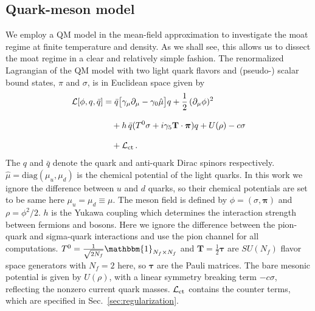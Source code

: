 \documentclass[reprint,english,superscriptaddress,preprintnumbers,amsmath,amssymb,aps,prd]{revtex4-2}
\def\Sec#1{Sec.~\ref{#1}}
\begin{document}
\subsection{Quark-meson model}\label{sec:qm_model}
%
We employ a QM model in the mean-field approximation to investigate the moat regime at finite temperature and density. As we shall see, this allows us to dissect the moat regime in a clear and relatively simple fashion. The renormalized Lagrangian of the QM model with two light quark flavors and (pseudo-) scalar bound states, $\pi$ and $\sigma$, is in Euclidean space given by
%
\begin{align}\label{eq:L}
\begin{split}
\mathcal{L}[\phi,q,\bar{q}]&=\bar{q}\big[\gamma_\mu\partial_\mu-\gamma_0 \hat{\mu}\big]q+\frac{1}{2}\,(\partial_\mu\phi)^2\\[2ex]
&\quad+h\,\bar{q}(T^0\sigma+i\gamma_5\mathbf{T}\cdot\boldsymbol{\pi})q+U(\rho)-c\sigma\\[2ex]
&\quad+ \mathcal{L}_{\rm ct}\,.
\end{split}
\end{align}
%
The $q$ and $\bar{q}$ denote the quark and anti-quark Dirac spinors respectively. $\hat{\mu}=\mathrm{diag}(\mu_u,\mu_d)$ is the chemical potential of the light quarks. In this work we ignore the difference between $u$ and $d$ quarks, so their chemical potentials are set to be same here $\mu_u=\mu_d\equiv\mu$. The meson field is defined by $\phi=(\sigma,\boldsymbol{\pi})$ and $\rho=\phi^2/2$. $h$ is the Yukawa coupling which determines the interaction strength between fermions and bosons. Here we ignore the difference between the pion-quark and sigma-quark interactions and use the pion channel for all computations. $T^0=\frac{1}{\sqrt{2N_f}}\mathbbm{1}_{N_f\times N_f}$ and $\mathbf{T}=\frac{1}{2}\boldsymbol{\tau}$ are $SU(N_f)$ flavor space generators with $N_f=2$ here, so $\boldsymbol{\tau}$ are the Pauli matrices.  The bare mesonic potential is given by $U(\rho)$, with a linear symmetry breaking term $-c\sigma$, reflecting the nonzero current quark masses. $\mathcal{L}_{\rm ct}$ contains the counter terms, which are specified in \Sec{sec:regularization}.
\end{document}

